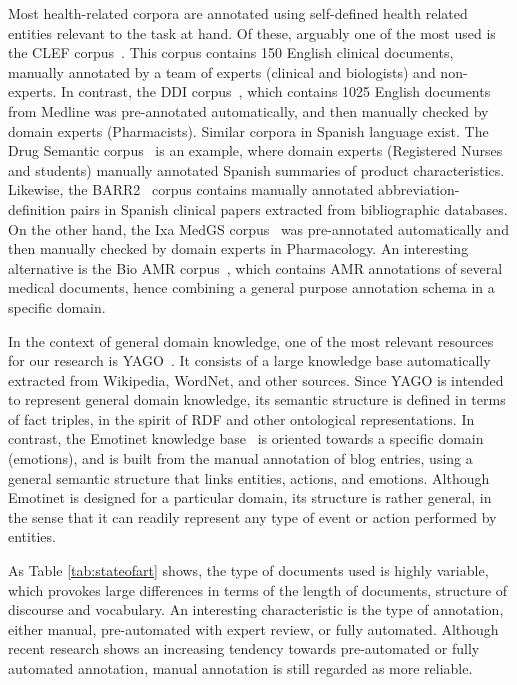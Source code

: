     Most health-related corpora are annotated using self-defined health
    related entities relevant to the task at hand.
    Of these, arguably one of the most used is the CLEF
    corpus~\cite{kelly2016overview}.
    This corpus contains 150 English clinical documents, manually annotated by a
    team of experts (clinical and biologists) and non-experts.
    In contrast, the DDI corpus~\cite{herrero2013ddi}, which contains 1025 English
    documents from Medline was pre-annotated automatically, and then manually
    checked by domain experts (Pharmacists).
    Similar corpora in Spanish language exist.
    The Drug Semantic corpus~\cite{moreno2017drugsemantics} is an example, where
    domain experts (Registered Nurses and students) manually annotated Spanish
    summaries of product characteristics.
    {Likewise, the BARR2}~\cite{barr2} {corpus contains manually annotated abbreviation-definition
    pairs in Spanish clinical papers extracted from bibliographic databases.}
    On the other hand, the Ixa MedGS corpus~\cite{oronoz2015creation} was
    pre-annotated automatically and then manually checked by domain experts in
    Pharmacology.
    An interesting alternative is the Bio AMR corpus~\cite{bioamr}, which contains
    AMR annotations of several medical documents, hence combining a general purpose
    annotation schema in a specific domain.

    In the context of general domain knowledge, one of the most relevant resources
    for our research is YAGO~\cite{fabian2007yago}.
    It consists of a large knowledge base automatically extracted from Wikipedia,
    WordNet, and other sources.
    Since YAGO is intended to represent general domain knowledge, its semantic
    structure is defined in terms of fact triples, in the spirit of RDF and other
    ontological representations.
    In contrast, the Emotinet knowledge base~\cite{emotinet} is oriented towards a
    specific domain (emotions), and is built from the manual annotation of blog
    entries, using a general semantic structure that links entities, actions, and
    emotions.
    Although Emotinet is designed for a particular domain, its structure is rather
    general, in the sense that it can readily represent any type of event or action
    performed by entities.

    As Table \ref{tab:stateofart} shows, the type of documents used is highly
    variable, which provokes large differences in terms of the length of documents,
    structure of discourse and vocabulary.
    An interesting characteristic is the type of annotation, either manual,
    pre-automated with expert review, or fully automated.
    Although recent research shows an increasing tendency towards pre-automated
    or fully automated annotation, manual annotation is still regarded as
    more reliable.

